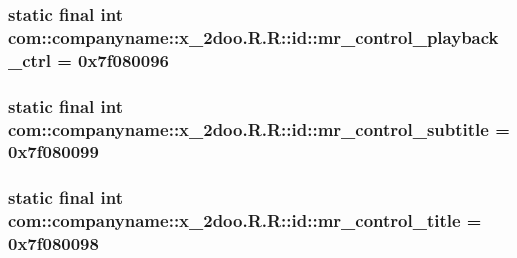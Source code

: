 \hypertarget{classcom_1_1companyname_1_1x__2doo_1_1_r_1_1id_dcd3c0a0a20d0fde73aa1ef825ae9b77}{
\subsubsection[{mr\_\-control\_\-playback\_\-ctrl}]{\setlength{\rightskip}{0pt plus 5cm}static final int com::companyname::x\_\-2doo.R.R::id::mr\_\-control\_\-playback\_\-ctrl = 0x7f080096}}
\label{classcom_1_1companyname_1_1x__2doo_1_1_r_1_1id_dcd3c0a0a20d0fde73aa1ef825ae9b77}


\hypertarget{classcom_1_1companyname_1_1x__2doo_1_1_r_1_1id_d6ca2a28dfafb1b852605cff004f26f2}{
\subsubsection[{mr\_\-control\_\-subtitle}]{\setlength{\rightskip}{0pt plus 5cm}static final int com::companyname::x\_\-2doo.R.R::id::mr\_\-control\_\-subtitle = 0x7f080099}}
\label{classcom_1_1companyname_1_1x__2doo_1_1_r_1_1id_d6ca2a28dfafb1b852605cff004f26f2}


\hypertarget{classcom_1_1companyname_1_1x__2doo_1_1_r_1_1id_72bd41aa5c0ec683339440c38bca3df4}{
\subsubsection[{mr\_\-control\_\-title}]{\setlength{\rightskip}{0pt plus 5cm}static final int com::companyname::x\_\-2doo.R.R::id::mr\_\-control\_\-title = 0x7f080098}}
\label{classcom_1_1companyname_1_1x__2doo_1_1_r_1_1id_72bd41aa5c0ec683339440c38bca3df4}


